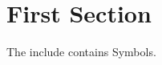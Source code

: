 \documentclass{article}
\begin{document}
\section{First Section}
The include contains Symbols.
\end{document}

